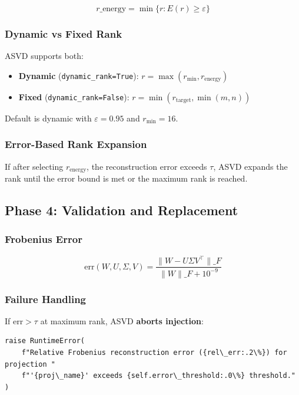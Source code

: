 \[
r\_\text{energy} = \min\{r : E(r) \geq \varepsilon\}
\]

\subsubsection{Dynamic vs Fixed Rank}

ASVD supports both:

\begin{itemize}
\item \textbf{Dynamic} (\texttt{dynamic\_rank=True}): $r = \max(r_\text{min}, r_\text{energy})$
\item \textbf{Fixed} (\texttt{dynamic\_rank=False}): $r = \min(r_\text{target}, \min(m, n))$

\end{itemize}
Default is dynamic with $\varepsilon = 0.95$ and 
$r_\text{min} = 16$.

\subsubsection{Error-Based Rank Expansion}

If after selecting $r_\text{energy}$, the reconstruction error exceeds 
$\tau$, ASVD expands the rank until the error bound is met or the maximum 
rank is reached.

\subsection{Phase 4: Validation and Replacement}

\subsubsection{Frobenius Error}

\[
\text{err}(W, U, \Sigma, V) = \frac{\|W - U \Sigma V^\top\|\_F}{\|W\|\_F + 10^{-9}}
\]

\subsubsection{Failure Handling}

If $\text{err} > \tau$ at maximum rank, ASVD \textbf{aborts injection}:

\begin{lstlisting}
raise RuntimeError(
    f"Relative Frobenius reconstruction error ({rel\_err:.2\%}) for projection "
    f"'{proj\_name}' exceeds {self.error\_threshold:.0\%} threshold."
)
\end{lstlisting}

